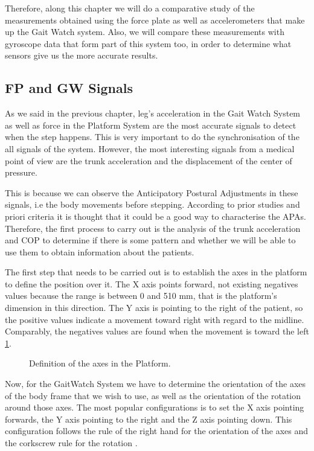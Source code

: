 Therefore, along this chapter we will do a comparative study of the measurements obtained using the force plate as well as accelerometers that make up the Gait Watch system. Also, we will compare these measurements with gyroscope data that form part of this system too, in order to determine what sensors give us the more accurate results.

\subsection{FP and GW Signals}
As we said in the previous chapter, leg's acceleration in the Gait Watch System as well as force in the Platform System are the most accurate signals to detect when the step happens. This is very important to do the synchronisation of the all signals of the system. However, the most interesting signals from a medical point of view are the trunk acceleration and the displacement of the center of pressure.

This is because we can observe the Anticipatory Postural Adjustments in these signals, i.e the body movements before stepping. According to prior studies and priori criteria it is thought that it could be a good way to characterise the APAs.
Therefore, the first process to carry out is the analysis of the trunk acceleration and COP to determine if there is some pattern and whether we will be able to use them to obtain information about the patients.

The first step that needs to be carried out is to establish the axes in the platform to define the position over it. The X axis points forward, not existing negatives values because the range is between 0 and 510 mm, that is the platform’s dimension in this direction. The Y axis is pointing to the right of the patient, so the positive values indicate a movement toward right with regard to the midline. Comparably, the negatives values are found when the movement is toward the left \ref{fig:axesFP}.
\begin{figure}[H]
	\centering
	\caption{Definition of the axes in the Platform.}
	\label{fig:axesFP}
\end{figure}
Now, for the GaitWatch System we have to determine the orientation of the axes of the body frame that we wish to use, as well as the orientation of the rotation around those axes. The most popular configurations is to set the X axis pointing forwards, the Y axis pointing to the right and the Z axis pointing down. This configuration follows the rule of the right hand for the orientation of the axes and the corkscrew rule for the rotation \cite{OlivaresBotzel2013}. 

